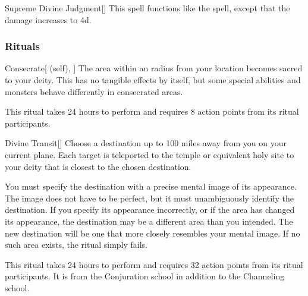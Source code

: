 \lowercase{\hypertarget{spell:Supreme Divine Judgment}{}}\label{spell:Supreme Divine Judgment}
\begin{freeability}[Rank 8]{\hypertarget{spell:Supreme Divine Judgment}{Supreme Divine Judgment}}[]
This spell functions like the  spell, except that the damage increases to  \plus4d.
\end{freeability}
\vspace{0.25em}



\subsubsection{Rituals}


\lowercase{\hypertarget{spell:Consecrate}{}}\label{spell:Consecrate}
\begin{attuneability}[Rank 3]{\hypertarget{spell:Consecrate}{Consecrate}}[ (self), ]
\targetrule
The area within an \arealarge radius  from your location becomes sacred to your deity.
This has no tangible effects by itself, but some special abilities and monsters behave differently in consecrated areas.

This ritual takes 24 hours to perform and requires 8 action points from its ritual participants.
\end{attuneability}
\vspace{0.25em}



\lowercase{\hypertarget{spell:Divine Transit}{}}\label{spell:Divine Transit}
\begin{apability}[Rank 5]{\hypertarget{spell:Divine Transit}{Divine Transit}}[]
Choose a destination up to 100 miles away from you on your current plane.
Each target is teleported to the temple or equivalent holy site to your deity that is closest to the chosen destination.

You must specify the destination with a precise mental image of its appearance.
The image does not have to be perfect, but it must unambiguously identify the destination.
If you specify its appearance incorrectly, or if the area has changed its appearance, the destination may be a different area than you intended.
The new destination will be one that more closely resembles your mental image.
If no such area exists, the ritual simply fails.

This ritual takes 24 hours to perform and requires 32 action points from its ritual participants.
It is from the Conjuration school in addition to the Channeling school.
\end{apability}
\vspace{0.25em}


